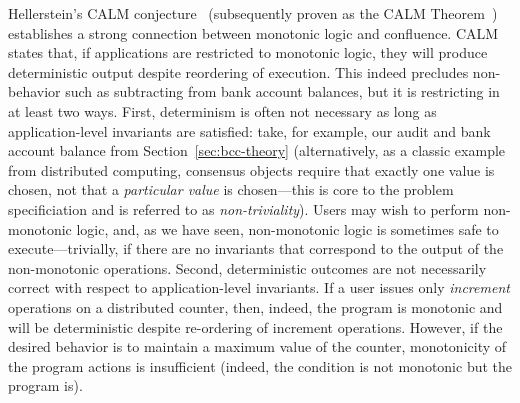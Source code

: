  Hellerstein's CALM conjecture~\cite{calm}
(subsequently proven as the CALM Theorem~\cite{ameloot-calm})
establishes a strong connection between monotonic logic and
confluence. CALM states that, if applications are restricted to
monotonic logic, they will produce deterministic output despite
reordering of execution. This indeed precludes non-\iconfluent
behavior such as subtracting from bank account balances, but it is
restricting in at least two ways. First, determinism is often not
necessary as long as application-level invariants are satisfied: take,
for example, our audit and bank account balance from
Section~\ref{sec:bcc-theory} (alternatively, as a classic example from
distributed computing, consensus objects require that exactly one
value is chosen, not that a \textit{particular value} is chosen---this
is core to the problem specificiation and is referred to as
\textit{non-triviality}). Users may wish to perform non-monotonic
logic, and, as we have seen, non-monotonic logic is sometimes safe to
execute---trivially, if there are no invariants that correspond to the
output of the non-monotonic operations. Second, deterministic outcomes
are not necessarily correct with respect to application-level
invariants. If a user issues only \textit{increment} operations on a
distributed counter, then, indeed, the program is monotonic and will
be deterministic despite re-ordering of increment operations. However,
if the desired behavior is to maintain a maximum value of the counter,
monotonicity of the program actions is insufficient (indeed, the
condition is not monotonic but the program is).
